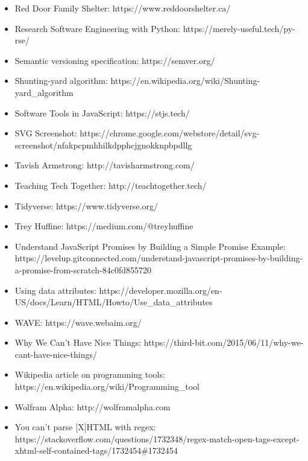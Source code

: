 \documentclass[krantzl]{krantz}
\begin{document}
\begin{itemize}
\item Red Door Family Shelter: https://www.reddoorshelter.ca/

\item Research Software Engineering with Python: https://merely-useful.tech/py-rse/

\item Semantic versioning specification: https://semver.org/

\item Shunting-yard algorithm: https://en.wikipedia.org/wiki/Shunting-yard\_algorithm

\item Software Tools in JavaScript: https://stjs.tech/

\item SVG Screenshot: https://chrome.google.com/webstore/detail/svg-screenshot/nfakpcpmhhilkdpphcjgnokknpbpdllg

\item Tavish Armstrong: http://tavisharmstrong.com/

\item Teaching Tech Together: http://teachtogether.tech/

\item Tidyverse: https://www.tidyverse.org/

\item Trey Huffine: https://medium.com/@treyhuffine

\item Understand JavaScript Promises by Building a Simple Promise Example: https://levelup.gitconnected.com/understand-javascript-promises-by-building-a-promise-from-scratch-84c0fd855720

\item Using data attributes: https://developer.mozilla.org/en-US/docs/Learn/HTML/Howto/Use\_data\_attributes

\item WAVE: https://wave.webaim.org/

\item Why We Can't Have Nice Things: https://third-bit.com/2015/06/11/why-we-cant-have-nice-things/

\item Wikipedia article on programming tools: https://en.wikipedia.org/wiki/Programming\_tool

\item Wolfram Alpha: http://wolframalpha.com

\item You can't parse [X]HTML with regex: https://stackoverflow.com/questions/1732348/regex-match-open-tags-except-xhtml-self-contained-tags/1732454\#1732454

\end{itemize}

\printindex
\end{document}
